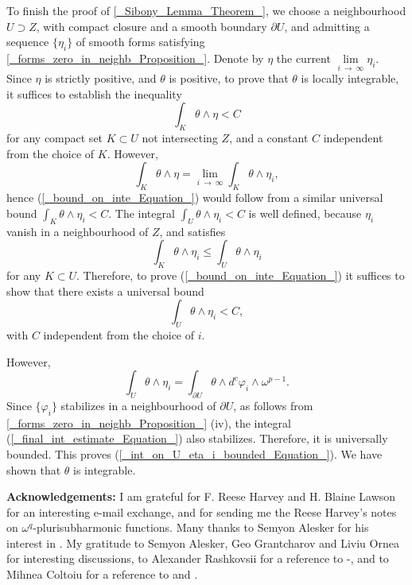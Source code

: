 \documentclass[11pt]{article}
\numberwithin{equation}{section}
\def\eqref#1{(\ref{#1})}
\newcommand{\arrow}{{\:\longrightarrow\:}}
\newcommand{\6}{\partial}
\renewcommand{\c}[1]{{\cal #1}}
\renewcommand{\phi}{\varphi}
\renewcommand{\leq}{\leqslant}
\def\blacksquare{\hbox{\vrule width 5pt height 5pt depth 0pt}}
\def\endproof{\blacksquare}
\begin{document}
To finish the proof of \ref{_Sibony_Lemma_Theorem_},
we choose a neighbourhood $U \supset Z$, with 
compact closure and a smooth boundary
$\6U$, and admitting a sequence $\{\eta_i\}$
of smooth forms satisfying \ref{_forms_zero_in_neighb_Proposition_}.
Denote by $\eta$ the current 
$\lim\limits_{i\arrow \infty} \eta_i$.
Since $\eta$ is strictly positive, and $\theta$ is positive,
to prove that $\theta$ 
is locally integrable, it suffices to establish
the inequality 
\begin{equation}\label{_bound_on_inte_Equation_} 
  \int_K \theta\wedge \eta <C
\end{equation}
for any compact set $K\subset U$ not intersecting $Z$,
and a constant $C$ independent from the choice of $K$.
However,
\[
\int_K \theta\wedge \eta= 
\lim\limits_{i\arrow \infty} \int_K \theta\wedge\eta_i,
\]
hence \eqref{_bound_on_inte_Equation_}  would follow
from a similar universal bound $\int_K \theta\wedge \eta_i <C$.
The integral $\int_U \theta\wedge \eta_i <C$ is well defined,
because $\eta_i$ vanish in a neighbourhood of $Z$, and satisfies
\[
\int_K \theta\wedge\eta_i \leq \int_U \theta\wedge \eta_i
\]
for any $K\subset U$. Therefore, to prove  \eqref{_bound_on_inte_Equation_}
it suffices to show that there exists a universal bound
\begin{equation}\label{_int_on_U_eta_i_bounded_Equation_}
\int_U \theta\wedge \eta_i <C,
\end{equation}
with $C$ independent from the choice of $i$.

However,
\begin{equation}\label{_final_int_estimate_Equation_}
\int_U \theta\wedge \eta_i= 
\int_{\6U} \theta\wedge d^c\phi_i \wedge \omega^{p-1}.
\end{equation}
Since $\{\phi_i\}$ stabilizes in a neighbourhood of $\6U$,
as follows from \ref{_forms_zero_in_neighb_Proposition_}
(iv), the integral \eqref{_final_int_estimate_Equation_}
also stabilizes. Therefore, it is universally bounded. 
This proves \eqref{_int_on_U_eta_i_bounded_Equation_}.
We have shown that $\theta$ is integrable.
\endproof


\hfill 

{\bf Acknowledgements:}
I am grateful for F. Reese Harvey and 
H. Blaine Lawson for an interesting e-mail exchange,
and for sending me the Reese Harvey's notes on 
$\omega^q$-plurisubharmonic functions.
Many thanks to Semyon Alesker for his interest in 
\cite{_V:reflexive_}. My gratitude to Semyon Alesker,
Geo Grantcharov and Liviu Ornea for interesting
discussions, to Alexander Rashkovsii for a reference
to \cite{_Khusanov_1_}-\cite{_Khusanov_3_}, and
to Mihnea Col\c toiu for a reference to 
\cite{_Wu:q_complete_} and \cite{_Napier_Ramachandran_}.
\end{document}
